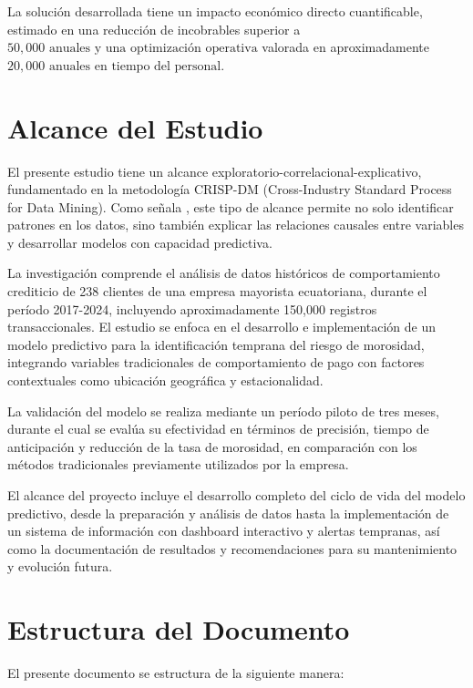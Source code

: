 La solución desarrollada tiene un impacto económico directo cuantificable, estimado en una reducción de incobrables superior a $50,000 \text{ anuales y una optimización operativa}$ valorada en aproximadamente $20,000 \text{ anuales en tiempo del personal}$.

\section{Alcance del Estudio}

El presente estudio tiene un alcance exploratorio-correlacional-explicativo, fundamentado en la metodología CRISP-DM (Cross-Industry Standard Process for Data Mining). Como señala \cite{hernandez2020metodologia}, este tipo de alcance permite no solo identificar patrones en los datos, sino también explicar las relaciones causales entre variables y desarrollar modelos con capacidad predictiva.

La investigación comprende el análisis de datos históricos de comportamiento crediticio de 238 clientes de una empresa mayorista ecuatoriana, durante el período 2017-2024, incluyendo aproximadamente 150,000 registros transaccionales. El estudio se enfoca en el desarrollo e implementación de un modelo predictivo para la identificación temprana del riesgo de morosidad, integrando variables tradicionales de comportamiento de pago con factores contextuales como ubicación geográfica y estacionalidad.

La validación del modelo se realiza mediante un período piloto de tres meses, durante el cual se evalúa su efectividad en términos de precisión, tiempo de anticipación y reducción de la tasa de morosidad, en comparación con los métodos tradicionales previamente utilizados por la empresa.

El alcance del proyecto incluye el desarrollo completo del ciclo de vida del modelo predictivo, desde la preparación y análisis de datos hasta la implementación de un sistema de información con dashboard interactivo y alertas tempranas, así como la documentación de resultados y recomendaciones para su mantenimiento y evolución futura.

\section{Estructura del Documento}

El presente documento se estructura de la siguiente manera:

